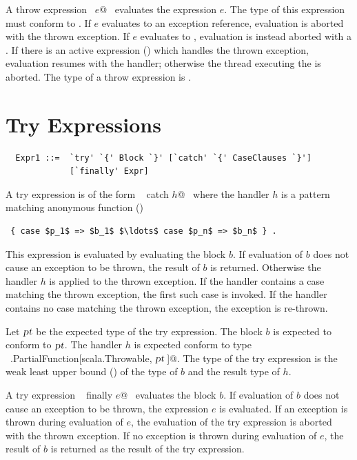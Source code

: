 A throw expression ~\lstinline@throw $e$@~ evaluates the expression
$e$. The type of this expression must conform to
.  If $e$ evaluates to an exception
reference, evaluation is aborted with the thrown exception. If $e$
evaluates to , evaluation is instead aborted with a
. If there is an active
 expression () which handles the thrown
exception, evaluation resumes with the handler; otherwise the thread
executing the  is aborted.  The type of a throw expression
is .

\section{Try Expressions}\label{sec:try}

\syntax\begin{lstlisting}
  Expr1 ::=  `try' `{' Block `}' [`catch' `{' CaseClauses `}'] 
             [`finally' Expr]
\end{lstlisting}

A try expression is of the form ~ catch $h$@~
where the handler $h$ is a pattern matching anonymous function 
()
\begin{lstlisting}
 { case $p_1$ => $b_1$ $\ldots$ case $p_n$ => $b_n$ } .
\end{lstlisting}
This expression is evaluated by evaluating the block
$b$.  If evaluation of $b$ does not cause an exception to be
thrown, the result of $b$ is returned. Otherwise the 
handler $h$ is applied to the thrown exception.  
If the handler contains a case matching the thrown exception,
the first such case is invoked. If the handler contains
no case matching the thrown exception, the exception is 
re-thrown. 

Let $\mbox{\sl pt}$ be the expected type of the try expression.  The block
$b$ is expected to conform to $\mbox{\sl pt}$.  The handler $h$
is expected conform to type
~\lstinline@scala.PartialFunction[scala.Throwable, $\mbox{\sl pt}\,$]@.  The
type of the try expression is the weak least upper bound ()
of the type of $b$
and the result type of $h$.

A try expression ~ finally $e$@~ evaluates the block
$b$.  If evaluation of $b$ does not cause an exception to be
thrown, the expression $e$ is evaluated. If an exception is thrown
during evaluation of $e$, the evaluation of the try expression is
aborted with the thrown exception. If no exception is thrown during
evaluation of $e$, the result of $b$ is returned as the
result of the try expression. 

